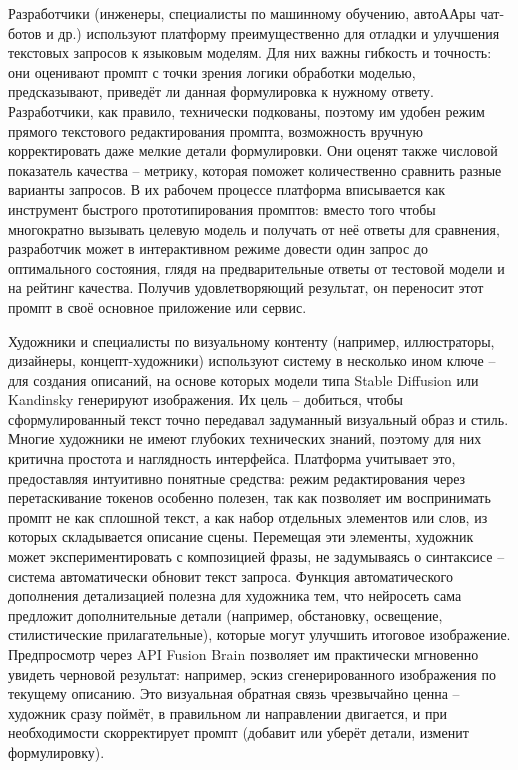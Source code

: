 Разработчики (инженеры, специалисты по машинному обучению, автоААры чат-ботов и др.) используют платформу преимущественно для отладки и улучшения текстовых запросов к языковым моделям. Для них важны гибкость и точность: они оценивают промпт с точки зрения логики обработки моделью, предсказывают, приведёт ли данная формулировка к нужному ответу. Разработчики, как правило, технически подкованы, поэтому им удобен режим прямого текстового редактирования промпта, возможность вручную корректировать даже мелкие детали формулировки. Они оценят также числовой показатель качества – метрику, которая поможет количественно сравнить разные варианты запросов. В их рабочем процессе платформа вписывается как инструмент быстрого прототипирования промптов: вместо того чтобы многократно вызывать целевую модель и получать от неё ответы для сравнения, разработчик может в интерактивном режиме довести один запрос до оптимального состояния, глядя на предварительные ответы от тестовой модели и на рейтинг качества. Получив удовлетворяющий результат, он переносит этот промпт в своё основное приложение или сервис.

Художники и специалисты по визуальному контенту (например, иллюстраторы, дизайнеры, концепт-художники) используют систему в несколько ином ключе – для создания описаний, на основе которых модели типа Stable Diffusion или Kandinsky генерируют изображения. Их цель – добиться, чтобы сформулированный текст точно передавал задуманный визуальный образ и стиль. Многие художники не имеют глубоких технических знаний, поэтому для них критична простота и наглядность интерфейса. Платформа учитывает это, предоставляя интуитивно понятные средства: режим редактирования через перетаскивание токенов особенно полезен, так как позволяет им воспринимать промпт не как сплошной текст, а как набор отдельных элементов или слов, из которых складывается описание сцены. Перемещая эти элементы, художник может экспериментировать с композицией фразы, не задумываясь о синтаксисе – система автоматически обновит текст запроса. Функция автоматического дополнения детализацией полезна для художника тем, что нейросеть сама предложит дополнительные детали (например, обстановку, освещение, стилистические прилагательные), которые могут улучшить итоговое изображение. Предпросмотр через API Fusion Brain позволяет им практически мгновенно увидеть черновой результат: например, эскиз сгенерированного изображения по текущему описанию. Это визуальная обратная связь чрезвычайно ценна – художник сразу поймёт, в правильном ли направлении двигается, и при необходимости скорректирует промпт (добавит или уберёт детали, изменит формулировку).


